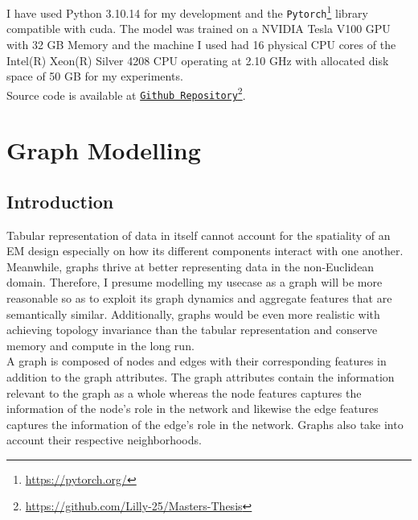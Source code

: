 \documentclass{report} %
\begin{document}
I have used Python 3.10.14 for my development and the \texttt{Pytorch}\footnote{\url{https://pytorch.org/}} library compatible with cuda.
The model was trained on a NVIDIA Tesla V100 \ac{GPU} with 32 GB Memory and the machine I used had 16 physical CPU cores of the Intel(R) Xeon(R) Silver 
4208 CPU operating at 2.10 GHz with allocated disk space of 50 GB for my experiments.\\
Source code is available at \texttt{\href{https://github.com/Lilly-25/Masters-Thesis}{Github Repository}}\footnote{\url{https://github.com/Lilly-25/Masters-Thesis}}.

\chapter{Graph Modelling} 

\section{Introduction}\label{sec:Introduction}

Tabular representation of data in itself cannot account for the spatiality of an \ac{EM} design especially on how its different components interact with one another. 
Meanwhile, graphs thrive at better representing data in the non-Euclidean domain.
Therefore, I presume modelling my usecase as a graph will be more reasonable so as to exploit its graph dynamics and aggregate features that are semantically similar.
Additionally, graphs would be even more realistic with achieving topology invariance than the tabular representation and conserve memory and compute in the long run.\\

A graph is composed of nodes and edges with their corresponding features in addition to the graph attributes.
The graph attributes contain the information relevant to the graph as a whole whereas the node features captures the information of the node's role in the network and 
likewise the edge features captures the information of the edge's role in the network. Graphs also take into account their respective neighborhoods.\\
\end{document}

